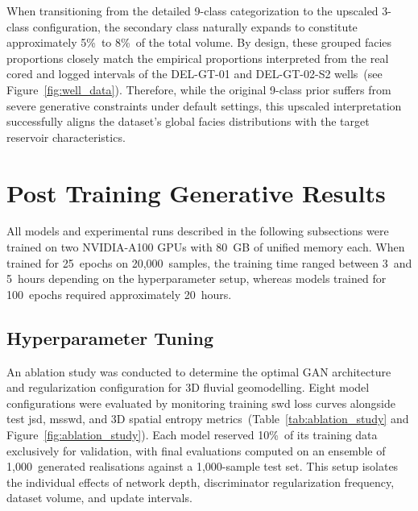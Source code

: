 When transitioning from the detailed 9-class categorization to the upscaled 3-class configuration, the secondary class naturally expands to constitute approximately 5\%~to 8\%~of the total volume. By design, these grouped facies proportions closely match the empirical proportions interpreted from the real cored and logged intervals of the DEL-GT-01 and DEL-GT-02-S2 wells~(see Figure~\ref{fig:well_data}). Therefore, while the original 9-class prior suffers from severe generative constraints under default settings, this upscaled interpretation successfully aligns the dataset's global facies distributions with the target reservoir characteristics.

\section{Post Training Generative Results}\label{Sec:Post_training_res}
All models and experimental runs described in the following subsections were trained on two NVIDIA-A100 GPUs with 80~GB of unified memory each. When trained for 25~epochs on 20,000~samples, the training time ranged between 3~and 5~hours depending on the hyperparameter setup, whereas models trained for 100~epochs required approximately 20~hours.

\subsection{Hyperparameter Tuning}\label{Sec:Hyperparam_results}
An ablation study was conducted to determine the optimal GAN architecture and regularization configuration for 3D fluvial geomodelling. Eight model configurations were evaluated by monitoring training \gls{swd} loss curves alongside test \gls{jsd}, \gls{msswd}, and 3D spatial entropy metrics~(Table~\ref{tab:ablation_study} and Figure~\ref{fig:ablation_study}). Each model reserved 10\%~of its training data exclusively for validation, with final evaluations computed on an ensemble of 1,000~generated realisations against a 1,000-sample test set. This setup isolates the individual effects of network depth, discriminator regularization frequency, dataset volume, and update intervals.

